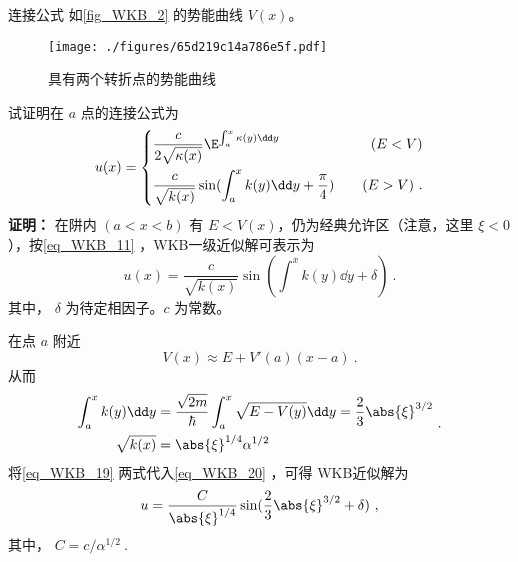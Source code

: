\begin{example}{连接公式}
如\autoref{fig_WKB_2} 的势能曲线 $V(x)$。
\begin{figure}[ht]
\centering
\texttt{[image: ./figures/65d219c14a786e5f.pdf]}
\caption{具有两个转折点的势能曲线} \label{fig_WKB_2}
\end{figure}
试证明在 $a$ 点的连接公式为
\begin{equation}
u(x)=\left\{\begin{aligned}
&\frac{c}{2\sqrt{\kappa(x)}}\E^{\int_a^x\kappa(y)\dd y} \quad &(E<V)\\
&\frac{c}{\sqrt{k(x)}}\sin(\int_a^x k(y)\dd y+\frac{\pi}{4})\quad &(E>V)~.
\end{aligned}\right.
\end{equation}
\textbf{证明：}
在阱内 $(a<x<b)$ 有 $E<V(x)$，仍为经典允许区（注意，这里 $\xi<0$），按\autoref{eq_WKB_11} ，WKB一级近似解可表示为
\begin{equation}\label{eq_WKB_20}
u(x)=\frac{c}{\sqrt{k(x)}}\sin(\int^x k(y)\dd y+\delta)~.
\end{equation}
其中， $\delta$ 为待定相因子。$c$ 为常数。

在点 $a$ 附近
\begin{equation}
V(x)\approx E+V'(a)(x-a)~.
\end{equation}
从而
\begin{equation}\label{eq_WKB_19}
\begin{aligned}
\int_a^xk(y)\dd y&=
\frac{\sqrt{2m}}{\hbar}\int_a^x\sqrt{E-V(y)}\dd y=\frac{2}{3}\abs{\xi}^{3/2}
\\
\sqrt{k(x)}
&=
\abs{\xi}^{1/4}\alpha^{1/2}
\end{aligned}~.
\end{equation}
将\autoref{eq_WKB_19} 两式代入\autoref{eq_WKB_20} ，可得 WKB近似解为
\begin{equation}\label{eq_WKB_21}
u=
\frac{C}{\abs{\xi}^{1/4}}\sin({\frac{2}{3}\abs{\xi}^{3/2}+\delta})~,
\end{equation}
其中， $C=c/\alpha^{1/2}~.$


\end{example}
